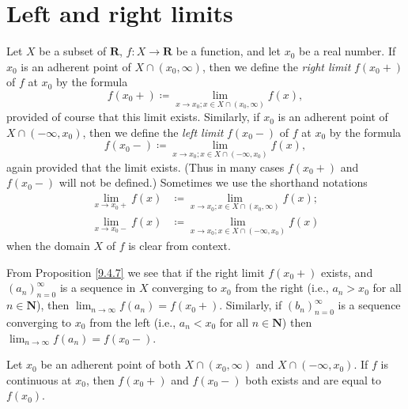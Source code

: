 \section{Left and right limits}\label{sec 9.5}

\begin{definition}\label{9.5.1}
    Let \(X\) be a subset of \(\mathbf{R}\), \(f : X \to \mathbf{R}\) be a function, and let \(x_0\) be a real number.
    If \(x_0\) is an adherent point of \(X \cap (x_0, \infty)\), then we define the \emph{right limit} \(f(x_0+)\) of \(f\) at \(x_0\) by the formula
    \[
        f(x_0+) \coloneqq \lim_{x \to x_0 ; x \in X \cap (x_0, \infty)} f(x),
    \]
    provided of course that this limit exists.
    Similarly, if \(x_0\) is an adherent point of \(X \cap (-\infty, x_0)\), then we define the \emph{left limit} \(f(x_0-)\) of \(f\) at \(x_0\) by the formula
    \[
        f(x_0-) \coloneqq \lim_{x \to x_0 ; x \in X \cap (-\infty, x_0)} f(x),
    \]
    again provided that the limit exists.
    (Thus in many cases \(f(x_0+)\) and \(f(x_0-)\) will not be defined.)
    Sometimes we use the shorthand notations
    \begin{align*}
        \lim_{x \to x_0+} f(x) & \coloneqq \lim_{x \to x_0 ; x \in X \cap (x_0, \infty)} f(x); \\
        \lim_{x \to x_0-} f(x) & \coloneqq \lim_{x \to x_0 ; x \in X \cap (-\infty, x_0)} f(x)
    \end{align*}
    when the domain \(X\) of \(f\) is clear from context.
\end{definition}

\begin{note}
    From Proposition \ref{9.4.7} we see that if the right limit \(f(x_0+)\) exists, and \((a_n)_{n = 0}^\infty\) is a sequence in \(X\) converging to \(x_0\) from the right (i.e., \(a_n > x_0\) for all \(n \in \mathbf{N}\)), then \(\lim_{n \to \infty} f(a_n) = f(x_0+)\).
    Similarly, if \((b_n)_{n = 0}^\infty\) is a sequence converging to \(x_0\) from the left (i.e., \(a_n < x_0\) for all \(n \in \mathbf{N}\)) then \(\lim_{n \to \infty} f(a_n) = f(x_0-)\).
\end{note}

\begin{additional corollary}\label{ac 9.5.1}
    Let \(x_0\) be an adherent point of both \(X \cap (x_0, \infty)\) and \(X \cap (-\infty, x_0)\).
    If \(f\) is continuous at \(x_0\), then \(f(x_0+)\) and \(f(x_0-)\) both exists and are equal to \(f(x_0)\).
\end{additional corollary}

